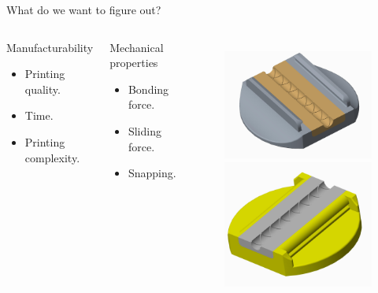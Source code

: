 \documentclass[10pt]{beamer}
\begin{document}
\begin{frame}[fragile]{What do we want to figure out?}	
\begin{columns}[T,onlytextwidth]
\begin{block}{Manufacturability}
\begin{itemize}
\item Printing quality.
\item Time.
\item Printing complexity.
\end{itemize}
\end{block}
\begin{block}{Mechanical properties}
\begin{itemize}
\item Bonding force.
\item Sliding force.
\item Snapping.
\end{itemize}
\end{block}
\begin{figure}
\includegraphics[scale=0.04]{chesttube_top} \\
\includegraphics[scale=0.04]{chesttube_base}

\end{figure}
\end{columns}
\end{frame}
\end{document}
